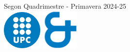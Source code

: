 \documentclass[11pt]{article}
\begin{document}
\begin{titlepage}

{\large Segon Quadrimestre - Primavera 2024-25}\\[2cm] 

\includegraphics[width=75px, keepaspectratio]{logoUPC.png}
\hspace{2cm}
\includegraphics[width=70px, keepaspectratio]{logoCFIS.png}
\\[1cm] %
 
\vfill %

\end{titlepage}
\end{document}
